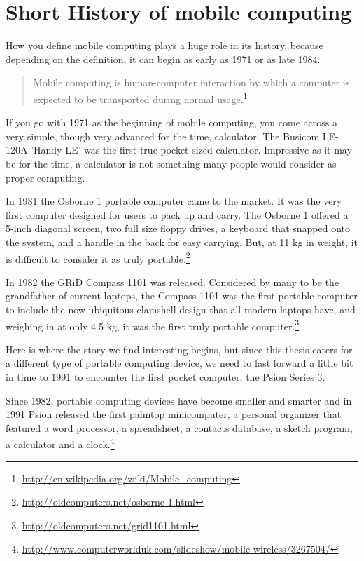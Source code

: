 \chapter{Short History of mobile computing}\label{ch:history}

How you define mobile computing plays a huge role in its history, because depending on the definition, it can begin as early as 1971 or as late 1984.

\begin{quotation}
Mobile computing is human-computer interaction by which a computer is expected to be transported during normal usage.\footnote{\url{http://en.wikipedia.org/wiki/Mobile_computing}}
\end{quotation}

If you go with 1971 as the beginning of mobile computing, you come across a very simple, though very advanced for the time, calculator. The Busicom LE-120A 'Handy-LE' was the first true pocket sized calculator. Impressive as it may be for the time, a calculator is not something many people would consider as proper computing.

In 1981 the Osborne 1 portable computer came to the market. It was the very first computer designed for users to pack up and carry. The Osborne 1 offered a 5-inch diagonal screen, two full size floppy drives, a keyboard that snapped onto the system, and a handle in the back for easy carrying. But, at 11 kg in weight, it is difficult to consider it as truly portable.\footnote{\url{http://oldcomputers.net/osborne-1.html}}

In 1982 the GRiD Compass 1101 was released. Considered by many to be the grandfather of current laptops, the Compass 1101 was the first portable computer to include the now ubiquitous clamshell design that all modern laptops have, and weighing in at only 4.5 kg, it was the first truly portable computer.\footnote{\url{http://oldcomputers.net/grid1101.html}}

Here is where the story we find interesting begins, but since this thesis caters for a different type of portable computing device, we need to fast forward a little bit in time to 1991 to encounter the first pocket computer, the Psion Series 3.

Since 1982, portable computing devices have become smaller and smarter and in 1991 Psion released the first palmtop minicomputer, a personal organizer that featured a word processor, a spreadsheet, a contacts database, a sketch program, a calculator and a clock.\footnote{\url{http://www.computerworlduk.com/slideshow/mobile-wireless/3267504/}}

